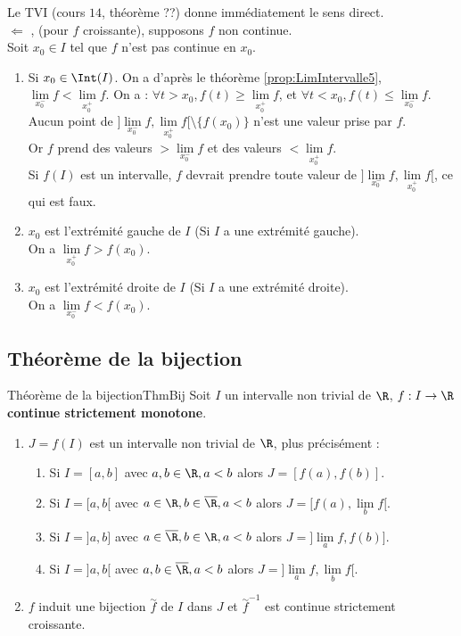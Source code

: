 \documentclass[12pt,a4paper]{report}
\begin{document}
\begin{demo}{}
Le TVI (cours $14$, théorème ??) donne immédiatement le sens direct. \\
$\Longleftarrow$ , (pour $f$ croissante), supposons $f$ non continue. \\
Soit $x_0 \in I$ tel que $f$ n'est pas continue en $x_0$.
\begin{enumerate}
	\item Si $x_0 \in \Int(I)$. On a d'après le théorème \ref{prop:LimIntervalle5}, $\underset{x_0^-}{\lim} f < \underset{x_0^+}{\lim} f$.
	On a : $\forall t > x_0, f(t) \geq \underset{x_0^+}{\lim} f$, et $\forall t < x_0, f(t) \leq \underset{x_0^-}{\lim} f$.
	Aucun point de $]\underset{x_0^-}{\lim} f, \underset{x_0^+}{\lim} f[ \setminus \{f(x_0)\}$ n'est une valeur prise par $f$. \\
	Or $f$ prend des valeurs $> \underset{x_0^-}{\lim} f$ et des valeurs $< \underset{x_0^+}{\lim} f$. \\
	Si $f(I)$ est un intervalle, $f$ devrait prendre toute valeur de $]\underset{x_0^-}{\lim} f, \underset{x_0^+}{\lim} f[$, ce qui est faux.
	\item $x_0$ est l'extrémité gauche de $I$ (Si $I$ a une extrémité gauche). \\
	On a $\underset{x_0^+}{\lim} f > f(x_0)$.
	\item $x_0$ est l'extrémité droite de $I$ (Si $I$ a une extrémité droite). \\
	On a $\underset{x_0^-}{\lim} f < f(x_0)$.
\end{enumerate}
\end{demo}


\subsection{Théorème de la bijection}

\begin{theoreme}{Théorème de la bijection}{ThmBij}
Soit $I$ un intervalle non trivial de $\R$, $f : I \to \R$ \textbf{continue strictement monotone}.
\begin{enumerate}
	\item $J = f(I)$ est un intervalle non trivial de $\R$, plus précisément :
	\begin{enumerate}
		\item Si $I = [a,b]$ avec $a,b\in \R, a<b$ alors $J = [f(a),f(b)]$.
		\item Si $I = [a,b[$ avec $a \in \R,b \in \overline{\R}, a<b$ alors $J = [f(a),\underset{b}{\lim} f[$.
		\item Si $I = ]a,b]$ avec $a \in \overline{\R}, b \in \R, a<b$ alors $J = ]\underset{a}{\lim} f, f(b)]$.
		\item Si $I = ]a,b[$ avec $a,b \in \overline{\R}, a<b$ alors $J = ]\underset{a}{\lim} f, \underset{b}{\lim} f[$.
	\end{enumerate}
	\item $f$ induit une bijection $\overset{\sim}{f}$ de $I$ dans $J$ et $\overset{\sim}{f}^{-1}$ est continue strictement croissante.
\end{enumerate}
\end{theoreme}
\end{document}
